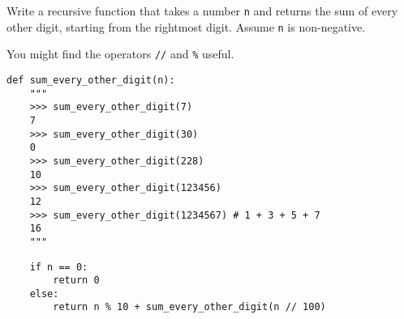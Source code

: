 \question Write a recursive function that takes a number {\tt n} and
returns the sum of every other digit, starting from the rightmost
digit. Assume {\tt n} is non-negative.

You might find the operators \texttt{//} and \texttt{\%} useful.
\begin{lstlisting}
def sum_every_other_digit(n):
    """
    >>> sum_every_other_digit(7)
    7
    >>> sum_every_other_digit(30)
    0
    >>> sum_every_other_digit(228)
    10
    >>> sum_every_other_digit(123456)
    12
    >>> sum_every_other_digit(1234567) # 1 + 3 + 5 + 7
    16
    """
\end{lstlisting}

\begin{solution}[1in]
\begin{lstlisting}
    if n == 0:
        return 0
    else:
        return n % 10 + sum_every_other_digit(n // 100)
\end{lstlisting}
\end{solution}
